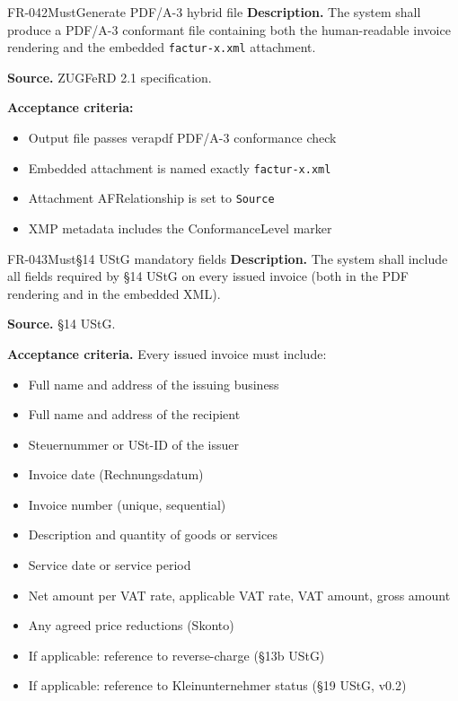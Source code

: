 \documentclass[11pt,a4paper]{article}
\begin{document}
\begin{requirement}{FR-042}{Must}{Generate PDF/A-3 hybrid file}
\textbf{Description.} The system shall produce a PDF/A-3 conformant file containing both the human-readable invoice rendering and the embedded \texttt{factur-x.xml} attachment.

\textbf{Source.} ZUGFeRD 2.1 specification.

\textbf{Acceptance criteria:}
\begin{itemize}
    \item Output file passes verapdf PDF/A-3 conformance check
    \item Embedded attachment is named exactly \texttt{factur-x.xml}
    \item Attachment AFRelationship is set to \texttt{Source}
    \item XMP metadata includes the ConformanceLevel marker
\end{itemize}
\end{requirement}

\begin{requirement}{FR-043}{Must}{\S14 UStG mandatory fields}
\textbf{Description.} The system shall include all fields required by \S14 UStG on every issued invoice (both in the PDF rendering and in the embedded XML).

\textbf{Source.} \S14 UStG.

\textbf{Acceptance criteria.} Every issued invoice must include:
\begin{itemize}
    \item Full name and address of the issuing business
    \item Full name and address of the recipient
    \item Steuernummer or USt-ID of the issuer
    \item Invoice date (Rechnungsdatum)
    \item Invoice number (unique, sequential)
    \item Description and quantity of goods or services
    \item Service date or service period
    \item Net amount per VAT rate, applicable VAT rate, VAT amount, gross amount
    \item Any agreed price reductions (Skonto)
    \item If applicable: reference to reverse-charge (\S13b UStG)
    \item If applicable: reference to Kleinunternehmer status (\S19 UStG, v0.2)
\end{itemize}
\end{requirement}
\end{document}
